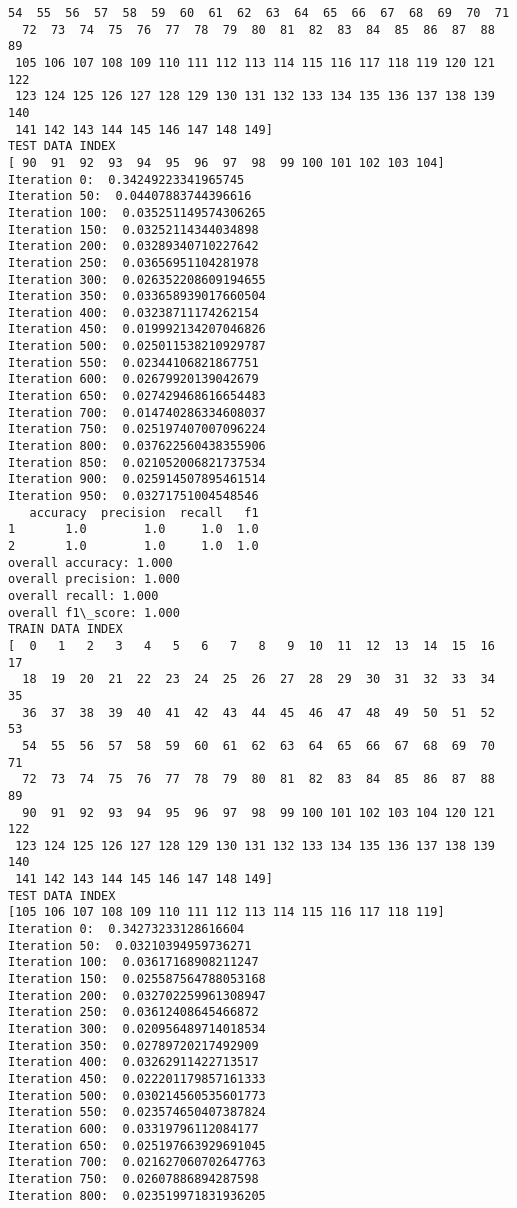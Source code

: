 \documentclass[11pt]{article}
\begin{document}
\begin{Verbatim}[commandchars=\\\{\}]
  54  55  56  57  58  59  60  61  62  63  64  65  66  67  68  69  70  71
  72  73  74  75  76  77  78  79  80  81  82  83  84  85  86  87  88  89
 105 106 107 108 109 110 111 112 113 114 115 116 117 118 119 120 121 122
 123 124 125 126 127 128 129 130 131 132 133 134 135 136 137 138 139 140
 141 142 143 144 145 146 147 148 149]
TEST DATA INDEX
[ 90  91  92  93  94  95  96  97  98  99 100 101 102 103 104]
Iteration 0:  0.34249223341965745
Iteration 50:  0.04407883744396616
Iteration 100:  0.035251149574306265
Iteration 150:  0.03252114344034898
Iteration 200:  0.03289340710227642
Iteration 250:  0.03656951104281978
Iteration 300:  0.026352208609194655
Iteration 350:  0.033658939017660504
Iteration 400:  0.03238711174262154
Iteration 450:  0.019992134207046826
Iteration 500:  0.025011538210929787
Iteration 550:  0.02344106821867751
Iteration 600:  0.02679920139042679
Iteration 650:  0.027429468616654483
Iteration 700:  0.014740286334608037
Iteration 750:  0.025197407007096224
Iteration 800:  0.037622560438355906
Iteration 850:  0.021052006821737534
Iteration 900:  0.025914507895461514
Iteration 950:  0.03271751004548546
   accuracy  precision  recall   f1
1       1.0        1.0     1.0  1.0
2       1.0        1.0     1.0  1.0
overall accuracy: 1.000
overall precision: 1.000
overall recall: 1.000
overall f1\_score: 1.000
TRAIN DATA INDEX
[  0   1   2   3   4   5   6   7   8   9  10  11  12  13  14  15  16  17
  18  19  20  21  22  23  24  25  26  27  28  29  30  31  32  33  34  35
  36  37  38  39  40  41  42  43  44  45  46  47  48  49  50  51  52  53
  54  55  56  57  58  59  60  61  62  63  64  65  66  67  68  69  70  71
  72  73  74  75  76  77  78  79  80  81  82  83  84  85  86  87  88  89
  90  91  92  93  94  95  96  97  98  99 100 101 102 103 104 120 121 122
 123 124 125 126 127 128 129 130 131 132 133 134 135 136 137 138 139 140
 141 142 143 144 145 146 147 148 149]
TEST DATA INDEX
[105 106 107 108 109 110 111 112 113 114 115 116 117 118 119]
Iteration 0:  0.34273233128616604
Iteration 50:  0.03210394959736271
Iteration 100:  0.03617168908211247
Iteration 150:  0.025587564788053168
Iteration 200:  0.032702259961308947
Iteration 250:  0.03612408645466872
Iteration 300:  0.020956489714018534
Iteration 350:  0.02789720217492909
Iteration 400:  0.03262911422713517
Iteration 450:  0.022201179857161333
Iteration 500:  0.030214560535601773
Iteration 550:  0.023574650407387824
Iteration 600:  0.03319796112084177
Iteration 650:  0.025197663929691045
Iteration 700:  0.021627060702647763
Iteration 750:  0.02607886894287598
Iteration 800:  0.023519971831936205

\end{Verbatim}
\end{document}
